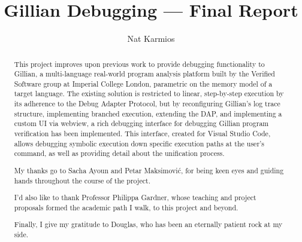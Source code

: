 \documentclass[a4paper, twoside]{report}
\title{Gillian Debugging --- Final Report}
\author{Nat Karmios}
\begin{document}
\def\chapterautorefname{\normalcolor{Chapter}\color{blue}}
\def\sectionautorefname{\normalcolor{\S}\kern-0.7ex\color{blue}}
\def\subsectionautorefname{\normalcolor{\S}\kern-0.7ex\color{blue}}
\def\figureautorefname{\normalcolor{Figure}\color{blue}}
\def\lstnumberautorefname{\normalcolor{line}\color{blue}}



\begin{abstract}
This project improves upon previous work to provide debugging functionality to
Gillian, a multi-language real-world program analysis platform built by the
Verified Software group at Imperial College London, parametric on the memory
model of a target language.
The existing solution is restricted to linear, step-by-step execution by its
adherence to the Debug Adapter Protocol, but by reconfiguring Gillian's log
trace structure, implementing branched execution, extending the DAP, and
implementing a custom UI via webview, a rich debugging interface for debugging
Gillian program verification has been implemented.
This interface, created for Visual Studio Code, allows debugging symbolic
execution down specific execution paths at the user's command, as well as
providing detail about the unification process.
\end{abstract}

\renewcommand{\abstractname}{Acknowledgements}
\begin{abstract}
My thanks go to Sacha Ayoun and Petar Maksimović, for being keen eyes and
guiding hands throughout the course of the project.

I'd also like to thank Professor Philippa Gardner, whose teaching and project
proposals formed the academic path I walk, to this project and beyond.

Finally, I give my gratitude to Douglas, who has been an eternally patient rock
at my side.
\end{abstract}

\listoftodos{}
\tableofcontents










\end{document}
